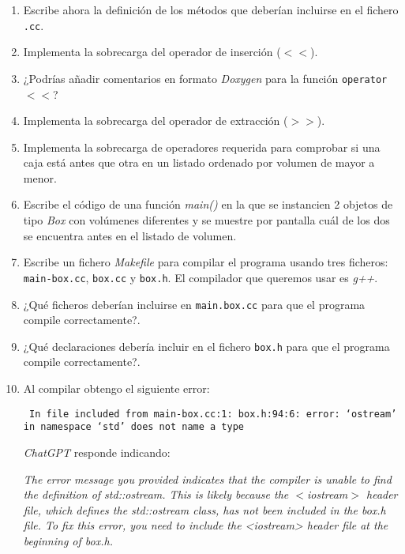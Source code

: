 \documentclass[twocolumn,twoside,a4paper, 10pt]{article}
\newcommand{\ChatGPT}{\textit{ChatGPT}{}}           %
\begin{document}
\begin{enumerate}
        El bot responde incluyendo en la definición de la clase un par de constructores, métodos mutadores 
        (\textit{setters}) y un par de métodos que permiten calcular volumen y área de la superficie de la caja.
        \ChatGPT{} informa asimismo de que declaración e implementación de la clase deberían ubicarse en sendos ficheros
        con extensiones \texttt{.cpp} y \texttt{.h}. 
  \item Escribe ahora la definición de los métodos que deberían incluirse en el fichero \texttt{.cc}.
  \item Implementa la sobrecarga del operador de inserción (\texttt{$<<$}).
  \item ¿Podrías añadir comentarios en formato \textit{Doxygen} para la función \texttt{operator$<<$}?
  \item Implementa la sobrecarga del operador de extracción (\texttt{$>>$}).
  \item Implementa la sobrecarga de operadores requerida para comprobar si una caja está antes que otra 
        en un listado ordenado por volumen de mayor a menor.
  \item Escribe el código de una función \textit{main()} en la que se instancien 2 objetos de tipo \textit{Box} 
        con volúmenes diferentes y se muestre por pantalla cuál de los dos se encuentra antes en el listado de volumen.
  \item Escribe un fichero \textit{Makefile} para compilar el programa usando tres ficheros:
    \texttt{main-box.cc}, \texttt{box.cc} y \texttt{box.h}.
        El compilador que queremos usar es \textit{g++}.
  \item ¿Qué ficheros deberían incluirse en \texttt{main.box.cc} para que el programa compile correctamente?.
  \item ¿Qué declaraciones debería incluir en el fichero \texttt{box.h} para que el programa compile
    correctamente?.
  \item Al compilar obtengo el siguiente error:

        \texttt{
In file included from main-box.cc:1:
box.h:94:6: error: ‘ostream’ in namespace ‘std’ does not name a type
        }

        \ChatGPT{} responde indicando:

        \textit{
        The error message you provided indicates that the compiler is unable to find the definition of std::ostream. 
        This is likely because the $<$iostream$>$ header file, which defines the std::ostream class, has not been included in the box.h file.
        To fix this error, you need to include the <iostream> header file at the beginning of box.h. 
        }
\end{enumerate}
\end{document}
